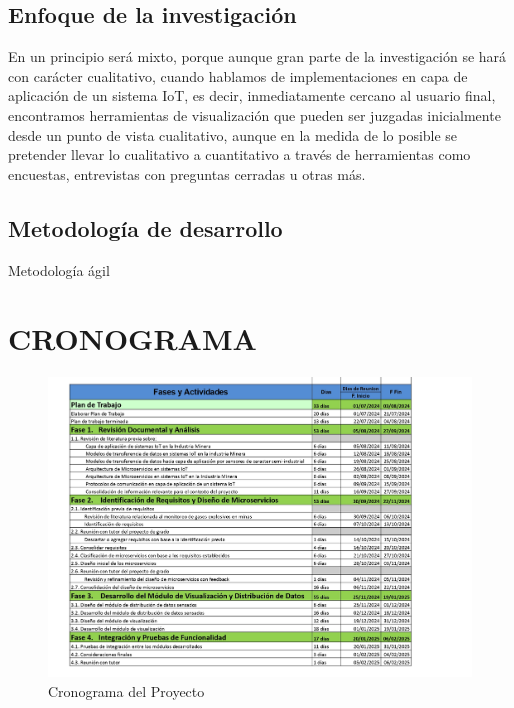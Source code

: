 \documentclass[stu,12pt,floatsintext]{apa7}
\begin{document}
	\subsection{Enfoque de la investigación}
	En un principio será mixto, porque aunque gran parte de la investigación se hará con carácter cualitativo, cuando hablamos de implementaciones en capa de aplicación de un sistema IoT, es decir, inmediatamente cercano al usuario final, encontramos herramientas de visualización que pueden ser juzgadas inicialmente desde un punto de vista cualitativo, aunque en la medida de lo posible se pretender llevar lo cualitativo a cuantitativo a través de herramientas como encuestas, entrevistas con preguntas cerradas u otras más.
	\subsection{Metodología de desarrollo}
	Metodología ágil
	
	\section{CRONOGRAMA}
		\begin{figure}[H]
		\centering
		\includegraphics[scale=0.6]{cronograma.jpg}
		\captionsetup{justification=centering}
		\caption{Cronograma del Proyecto}
		\small
		\label{cronograma}
	\end{figure}
\end{document}
